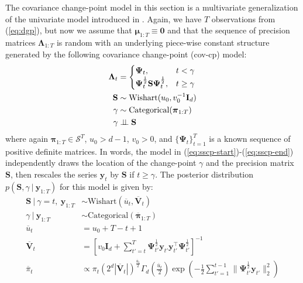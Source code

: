 The covariance change-point model in this section is a multivariate generalization of the univariate model introduced in \cite{Cappello22}. Again, we have $T$ observations from (\ref{eq:dgp}), but now we assume that $\boldsymbol{\mu}_{1:T} \equiv \mathbf{0}$ and that the sequence of precision matrices $\boldsymbol{\Lambda}_{1:T}$ is random with an underlying piece-wise constant structure generated by the following covariance change-point (cov-cp) model:
\begin{align}\label{eq:sscp-start}
    \boldsymbol{\Lambda}_t &= 
    \begin{cases}
        \boldsymbol{\Psi}_{t}, & t < \gamma  \\
        \boldsymbol{\Psi}^{\frac{1}{2}}_{t}\mathbf{S}\boldsymbol{\Psi}^{\frac{1}{2}}_{t}, & t \geq \gamma
    \end{cases}
    \\
    \mathbf{S} &\sim \text{Wishart}(u_0, v_0^{-1}\mathbf{I}_d) \\
    \gamma &\sim \text{Categorical}(\boldsymbol{\pi}_{1:T}) \\
    \gamma &\perp\!\!\!\perp \mathbf{S}
    \label{eq:sscp-end}
\end{align}
where again $\boldsymbol{\pi}_{1:T} \in \mathcal{S}^T$, $u_0 > d - 1$, $v_0 > 0$, and $\{\boldsymbol{\Psi}_{t}\}_{t=1}^T$ is a known sequence of positive definite matrices. In words, the model in (\ref{eq:sscp-start})-(\ref{eq:sscp-end}) independently draws the location of the change-point $\gamma$ and the precision matrix $\mathbf{S}$, then rescales the series $\mathbf{y}_t$ by $\mathbf{S}$ if $t \geq \gamma$. The posterior distribution $p(\mathbf{S}, \gamma\:|\:\mathbf{y}_{1:T})$ for this model is given by:
\begin{align}
    \mathbf{S} \:|\: \gamma = t, \: \mathbf{y}_{1:T} &\sim \text{Wishart}\left(\overline{u}_{t}, \overline{\mathbf{V}}_{t}\right) \label{eq:s-sscp} \\
    \gamma \:|\: \mathbf{y}_{1:T}  &\sim \text{Categorical}(\overline{\boldsymbol{\pi}}_{1:T}) \label{eq:gamma-sscp}\\
    \overline{u}_{t} &= u_0 + T - t + 1 \\
    \overline{\mathbf{V}}_{t} &= \left[v_0\mathbf{I}_d +  \sum_{t'=t}^{T} \boldsymbol{\Psi}^{\frac{1}{2}}_{t'}\mathbf{y}_{t'}\mathbf{y}^\intercal_{t'}\boldsymbol{\Psi}^{\frac{1}{2}}_{t'}\right]^{-1} \label{eq:v-sscp} \\
    \overline{\pi}_t &\propto \pi_t \left(2^d |\overline{\mathbf{V}}_{t}|\right)^{\frac{\overline{u}_{t}}{2}}\Gamma_d\left(\frac{\overline{u}_{t}}{2}\right)\exp\left(- \frac{1}{2}\sum_{t'=1}^{t-1} \lVert\boldsymbol{\Psi}_{t'}^{\frac{1}{2}}\mathbf{y}_{t'}\rVert_2^2\right) \label{eq:pi-sscp}
\end{align}

